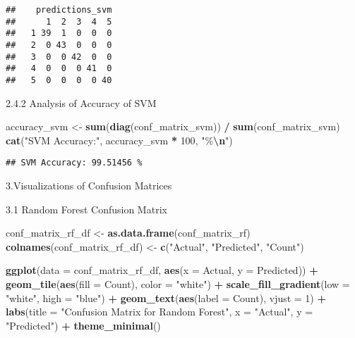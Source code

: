 \documentclass[
]{article}
\newenvironment{Shaded}{\begin{snugshade}}{\end{snugshade}}
\newcommand{\AttributeTok}[1]{\textcolor[rgb]{0.13,0.29,0.53}{#1}}
\newcommand{\DecValTok}[1]{\textcolor[rgb]{0.00,0.00,0.81}{#1}}
\newcommand{\FunctionTok}[1]{\textcolor[rgb]{0.13,0.29,0.53}{\textbf{#1}}}
\newcommand{\NormalTok}[1]{#1}
\newcommand{\OtherTok}[1]{\textcolor[rgb]{0.56,0.35,0.01}{#1}}
\newcommand{\SpecialCharTok}[1]{\textcolor[rgb]{0.81,0.36,0.00}{\textbf{#1}}}
\newcommand{\StringTok}[1]{\textcolor[rgb]{0.31,0.60,0.02}{#1}}
\begin{document}
\begin{verbatim}
##    predictions_svm
##      1  2  3  4  5
##   1 39  1  0  0  0
##   2  0 43  0  0  0
##   3  0  0 42  0  0
##   4  0  0  0 41  0
##   5  0  0  0  0 40
\end{verbatim}

2.4.2 Analysis of Accuracy of SVM

\begin{Shaded}
\begin{Highlighting}[]
\NormalTok{accuracy\_svm }\OtherTok{\textless{}{-}} \FunctionTok{sum}\NormalTok{(}\FunctionTok{diag}\NormalTok{(conf\_matrix\_svm)) }\SpecialCharTok{/} \FunctionTok{sum}\NormalTok{(conf\_matrix\_svm)}
\FunctionTok{cat}\NormalTok{(}\StringTok{"SVM Accuracy:"}\NormalTok{, accuracy\_svm }\SpecialCharTok{*} \DecValTok{100}\NormalTok{, }\StringTok{"\%}\SpecialCharTok{\textbackslash{}n}\StringTok{"}\NormalTok{)}
\end{Highlighting}
\end{Shaded}

\begin{verbatim}
## SVM Accuracy: 99.51456 %
\end{verbatim}

3.Visualizations of Confusion Matrices

3.1 Random Forest Confusion Matrix

\begin{Shaded}
\begin{Highlighting}[]
\NormalTok{conf\_matrix\_rf\_df }\OtherTok{\textless{}{-}} \FunctionTok{as.data.frame}\NormalTok{(conf\_matrix\_rf)}
\FunctionTok{colnames}\NormalTok{(conf\_matrix\_rf\_df) }\OtherTok{\textless{}{-}} \FunctionTok{c}\NormalTok{(}\StringTok{"Actual"}\NormalTok{, }\StringTok{"Predicted"}\NormalTok{, }\StringTok{"Count"}\NormalTok{)}

\FunctionTok{ggplot}\NormalTok{(}\AttributeTok{data =}\NormalTok{ conf\_matrix\_rf\_df, }\FunctionTok{aes}\NormalTok{(}\AttributeTok{x =}\NormalTok{ Actual, }\AttributeTok{y =}\NormalTok{ Predicted)) }\SpecialCharTok{+}
  \FunctionTok{geom\_tile}\NormalTok{(}\FunctionTok{aes}\NormalTok{(}\AttributeTok{fill =}\NormalTok{ Count), }\AttributeTok{color =} \StringTok{"white"}\NormalTok{) }\SpecialCharTok{+}
  \FunctionTok{scale\_fill\_gradient}\NormalTok{(}\AttributeTok{low =} \StringTok{"white"}\NormalTok{, }\AttributeTok{high =} \StringTok{"blue"}\NormalTok{) }\SpecialCharTok{+}
  \FunctionTok{geom\_text}\NormalTok{(}\FunctionTok{aes}\NormalTok{(}\AttributeTok{label =}\NormalTok{ Count), }\AttributeTok{vjust =} \DecValTok{1}\NormalTok{) }\SpecialCharTok{+}
  \FunctionTok{labs}\NormalTok{(}\AttributeTok{title =} \StringTok{"Confusion Matrix for Random Forest"}\NormalTok{, }\AttributeTok{x =} \StringTok{"Actual"}\NormalTok{, }\AttributeTok{y =} \StringTok{"Predicted"}\NormalTok{) }\SpecialCharTok{+}
  \FunctionTok{theme\_minimal}\NormalTok{()}
\end{Highlighting}
\end{Shaded}
\end{document}
